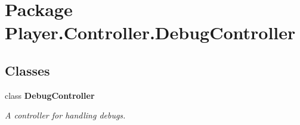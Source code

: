 \section{Package Player.\-Controller.\-Debug\-Controller}
\label{namespace_player_1_1_controller_1_1_debug_controller}
\subsection*{Classes}
\begin{DoxyCompactItemize}
\item 
class {\bf Debug\-Controller}
\begin{DoxyCompactList}\small\item\em A controller for handling debugs. \end{DoxyCompactList}\end{DoxyCompactItemize}
